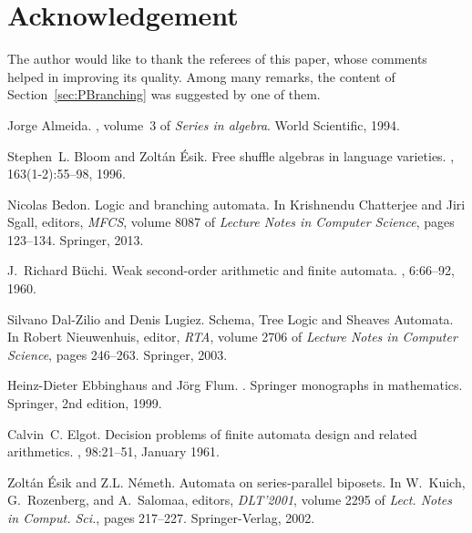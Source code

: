 \documentclass{CSML}
\begin{document}
\section*{Acknowledgement}

The author would like to thank the referees of this paper, whose comments helped in improving its quality. Among many remarks, the content of Section~\ref{sec:PBranching} was suggested by one of them.



\begin{thebibliography}{LW98b}

Jorge Almeida.
, volume~3 of {\em
  Series in algebra}.
\newblock World Scientific, 1994.

Stephen~L. Bloom and Zolt{\'a}n {\'E}sik.
\newblock Free shuffle algebras in language varieties.
, 163(1-2):55--98, 1996.

Nicolas Bedon.
\newblock Logic and branching automata.
\newblock In Krishnendu Chatterjee and Jiri Sgall, editors, {\em MFCS}, volume
  8087 of {\em Lecture Notes in Computer Science}, pages 123--134. Springer,
  2013.

J.~Richard B{\"u}chi.
\newblock Weak second-order arithmetic and finite automata.
, 6:66--92, 1960.

Silvano Dal-Zilio and Denis Lugiez.
 {S}chema, {T}ree {L}ogic and {S}heaves {A}utomata.
\newblock In Robert Nieuwenhuis, editor, {\em RTA}, volume 2706 of {\em Lecture
  Notes in Computer Science}, pages 246--263. Springer, 2003.

Heinz-Dieter Ebbinghaus and J{\"o}rg Flum.
.
\newblock Springer monographs in mathematics. Springer, 2nd edition, 1999.

Calvin~C. Elgot.
\newblock Decision problems of finite automata design and related arithmetics.
, 98:21--51, January 1961.

Zolt{\'a}n {\'E}sik and Z.L. N{\'e}meth.
\newblock Automata on series-parallel biposets.
\newblock In W.~Kuich, G.~Rozenberg, and A.~Salomaa, editors, {\em DLT'2001},
  volume 2295 of {\em Lect. Notes in Comput. Sci.}, pages 217--227.
  Springer-Verlag, 2002.


\end{thebibliography}
\end{document}
